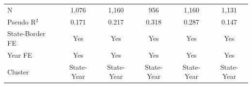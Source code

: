 \begin{tabular*}{\textwidth}{@{\extracolsep{\fill}}lccccc}
   \hline
   N              & 1,076         & 1,160          & 956            & 1,160          & 1,131\\  
   Pseudo R$^2$              & 0.171         & 0.217          & 0.318          & 0.287          & 0.147\\  
   State-Border FE           & Yes           & Yes            & Yes            & Yes            & Yes\\  
   Year FE                   & Yes           & Yes            & Yes            & Yes            & Yes\\  
   Cluster              & State-Year & State-Year & State-Year & State-Year & State-Year\\  
   \bottomrule
\end{tabular*}
\par\endgroup

